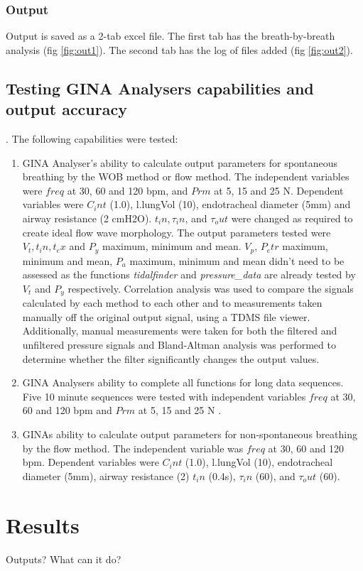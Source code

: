 \documentclass[12pt, openany, oneside]{book}
\begin{document}
\subsubsection{Output}
Output is saved as a 2-tab excel file. The first tab has the breath-by-breath analysis (fig \ref{fig:out1}). The second tab has the log of files added (fig \ref{fig:out2}).

\subsection{Testing GINA Analysers capabilities and output accuracy}.
The following capabilities were tested:
\begin{enumerate}
\item GINA Analyser's ability to calculate output parameters for spontaneous breathing by the WOB method or flow method. The independent variables were $freq$ at 30, 60 and 120 bpm, and $Prm$ at 5, 15 and 25 N. Dependent variables were $C_int$ (1.0), l.lungVol (10), endotracheal diameter (5mm) and airway resistance (2 cmH2O). $t_in, \tau_in$, and $\tau_out$ were changed as required to create ideal flow wave morphology.  The output parameters tested were $V_t, t_in, t_ex$ and $P_y$ maximum, minimum and mean. $V_p$,  $P_etr$ maximum, minimum and mean, $P_a$ maximum, minimum and mean didn't need to be assessed as the functions \textit{tidalfinder} and \textit{pressure\_data} are already tested by $V_t$ and $P_y$ respectively. Correlation analysis was used to compare the signals calculated by each method to each other and to measurements taken manually off the original output signal, using a TDMS file viewer. Additionally, manual measurements were taken for both the filtered and unfiltered pressure signals and Bland-Altman analysis was performed to determine whether the filter significantly changes the output values.
\item GINA Analysers ability to complete all functions for long data sequences. Five 10 minute sequences were tested with independent variables $freq$ at 30, 60 and 120 bpm and  $Prm$ at 5, 15 and 25 N .
\item GINAs ability to calculate output parameters for non-spontaneous breathing by the flow method. The independent variable was $freq$ at 30, 60 and 120 bpm.  Dependent variables were $C_int$ (1.0), l.lungVol (10), endotracheal diameter (5mm), airway resistance (2) $t_in$ (0.4s), $\tau_in$ (60), and $\tau_out$ (60).
\end{enumerate}


\section{Results}
Outputs? What can it do? 
\end{document}
